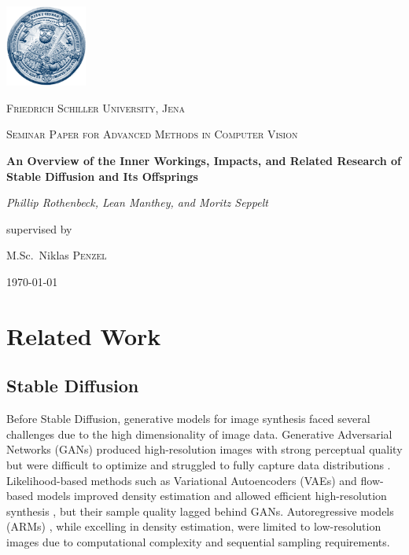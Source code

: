 \documentclass[11pt]{article}
\begin{document}
\begin{titlepage}
    \centering
    \includegraphics[width=0.2\textwidth]{assets/uni-logo.png}\par\vspace{0.5cm}
    {\scshape\LARGE Friedrich Schiller University, Jena \par}
    \vspace{1cm}
    {\scshape\Large Seminar Paper for Advanced Methods in Computer Vision\par}
    \vspace{1.5cm}
    {\huge\bfseries An Overview of the Inner Workings, Impacts, and Related Research of Stable Diffusion and Its Offsprings\par}
    \vspace{2cm}
    {\Large\itshape Phillip Rothenbeck, Lean Manthey, and Moritz Seppelt\par}
    \vfill
    supervised by\par
    M.Sc.~Niklas \textsc{Penzel}

    \vfill

    {\large \today\par}
\end{titlepage}

\tableofcontents
\newpage



\section{Related Work}
\subsection{Stable Diffusion}
Before Stable Diffusion, generative models for image synthesis faced several challenges due to the high dimensionality of image data. Generative Adversarial Networks (GANs) \cite{goodfellow2014GAN} produced high-resolution images with strong perceptual quality \cite{bigganbrock, DBLP:journals/corr/abs-1912-04958} but were difficult to optimize and struggled to fully capture data distributions \cite{arjovsky2017wasserstein, gulrajani2017improved, DBLP:journals/corr/abs-1801-04406}. Likelihood-based methods such as Variational Autoencoders (VAEs) \cite{VAE} and flow-based models \cite{dinh2015nice, DBLP:conf/iclr/DinhSB17} improved density estimation and allowed efficient high-resolution synthesis \cite{DBLP:journals/corr/abs-2011-10650, glow, DBLP:conf/nips/VahdatK20}, but their sample quality lagged behind GANs. Autoregressive models (ARMs) \cite{DBLP:conf/icml/ChenRC0JLS20, DBLP:journals/corr/abs-1904-10509, NIPS2016_b1301141, DBLP:journals/corr/OordKK16}, while excelling in density estimation, were limited to low-resolution images due to computational complexity and sequential sampling requirements.
\end{document}
